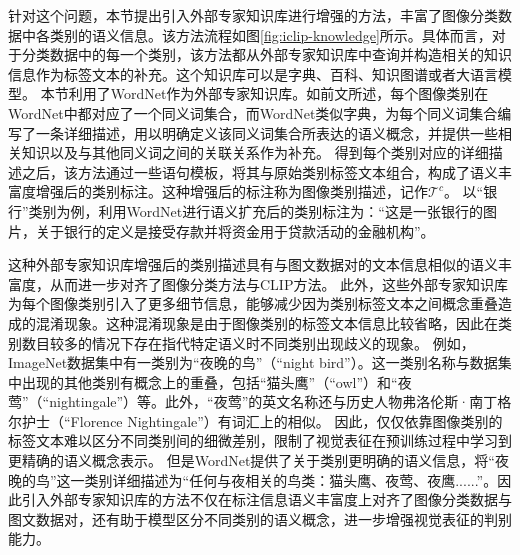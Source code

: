 针对这个问题，本节提出引入外部专家知识库进行增强的方法，丰富了图像分类数据中各类别的语义信息。该方法流程如图\ref{fig:iclip-knowledge}所示。具体而言，对于分类数据中的每一个类别，该方法都从外部专家知识库中查询并构造相关的知识信息作为标签文本的补充。这个知识库可以是字典、百科、知识图谱或者大语言模型。
本节利用了WordNet作为外部专家知识库。如前文所述，每个图像类别在WordNet中都对应了一个同义词集合，而WordNet类似字典，为每个同义词集合编写了一条详细描述，用以明确定义该同义词集合所表达的语义概念，并提供一些相关知识以及与其他同义词之间的关联关系作为补充。
得到每个类别对应的详细描述之后，该方法通过一些语句模板，将其与原始类别标签文本组合，构成了语义丰富度增强后的类别标注。这种增强后的标注称为图像类别描述，记作$\mathcal{T}^{c}$。
以“银行”类别为例，利用WordNet进行语义扩充后的类别标注为：“这是一张银行的图片，关于银行的定义是接受存款并将资金用于贷款活动的金融机构”。


 这种外部专家知识库增强后的类别描述具有与图文数据对的文本信息相似的语义丰富度，从而进一步对齐了图像分类方法与CLIP方法。
 此外，这些外部专家知识库为每个图像类别引入了更多细节信息，能够减少因为类别标签文本之间概念重叠造成的混淆现象。这种混淆现象是由于图像类别的标签文本信息比较省略，因此在类别数目较多的情况下存在指代特定语义时不同类别出现歧义的现象。
 例如，ImageNet数据集中有一类别为“夜晚的鸟”（“night bird”）。这一类别名称与数据集中出现的其他类别有概念上的重叠，包括“猫头鹰”（“owl”）和“夜莺”（“nightingale”）等。此外，“夜莺”的英文名称还与历史人物弗洛伦斯·南丁格尔护士（“Florence Nightingale”）有词汇上的相似。
 因此，仅仅依靠图像类别的标签文本难以区分不同类别间的细微差别，限制了视觉表征在预训练过程中学习到更精确的语义概念表示。
 但是WordNet提供了关于类别更明确的语义信息，将“夜晚的鸟”这一类别详细描述为“任何与夜相关的鸟类：猫头鹰、夜莺、夜鹰......”。因此引入外部专家知识库的方法不仅在标注信息语义丰富度上对齐了图像分类数据与图文数据对，还有助于模型区分不同类别的语义概念，进一步增强视觉表征的判别能力。


